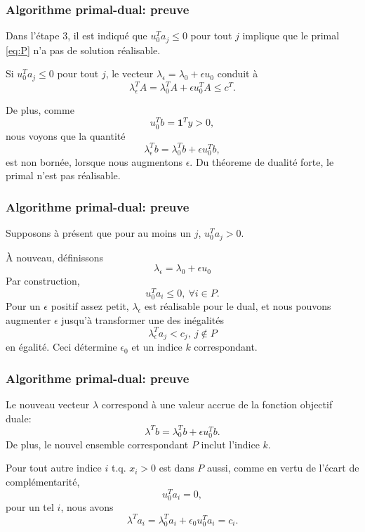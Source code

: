 \documentclass[t,usepdftitle=false]{beamer}
\def\bone{\boldsymbol{1}}
\begin{document}
\begin{frame}
\frametitle{Algorithme primal-dual: preuve}

Dans l'étape 3, il est indiqué que $u_0^T a_j \leq 0$ pour tout $j$ implique que le primal \eqref{eq:P} n'a pas de solution réalisable.

\mbox{}

Si $u_0^T a_j \leq 0$ pour tout $j$, le vecteur
$\lambda_{\epsilon} = \lambda_0 + \epsilon u_0$ conduit à
\[
\lambda_{\epsilon}^TA = \lambda_0^TA + \epsilon u_0^TA \leq c^T.
\]

\mbox{}

De plus, comme
\[
u_0^T b = \bone^T y > 0,
\]
nous voyons que la quantité
\[
\lambda_{\epsilon}^Tb = \lambda_0^Tb + \epsilon u_0^T b,
\]
est non bornée, lorsque nous augmentons $\epsilon$.
Du théoreme de dualité forte, le primal n'est pas réalisable.

\end{frame}

\begin{frame}
\frametitle{Algorithme primal-dual: preuve}

Supposons à présent que pour au moins un $j$, $u_0^T a_j > 0$.

\mbox{}

À nouveau, définissons
\[
\lambda_{\epsilon} = \lambda_0 + \epsilon u_0
\]
Par construction,
\[
u_0^T a_i \leq 0, \ \forall i \in P.
\]
Pour un $\epsilon$ positif assez petit, $\lambda_{\epsilon}$ est réalisable pour le dual, et nous pouvons augmenter $\epsilon$ jusqu'à transformer une des inégalités
\[
\lambda_{\epsilon}^T a_j < c_j,\ j \notin P
\]
en égalité.
Ceci détermine $\epsilon_0$ et un indice $k$ correspondant.

\end{frame}

\begin{frame}
\frametitle{Algorithme primal-dual: preuve}

Le nouveau vecteur $\lambda$ correspond à une valeur accrue de la fonction objectif duale:
\[
\lambda^T b = \lambda_0^T b + \epsilon u_0^T b.
\]
De plus, le nouvel ensemble correspondant $P$ inclut l'indice $k$.

\mbox{}

Pour tout autre indice $i$ t.q. $x_i > 0$ est dans $P$ aussi, comme en vertu de l'écart de complémentarité,
\[
u_0^T a_i = 0,
\]
pour un tel $i$, nous avons
\[
\lambda^T a_i = \lambda_0^T a_i + \epsilon_0 u_0^T a_i = c_i.
\]

\end{frame}
\end{document}
